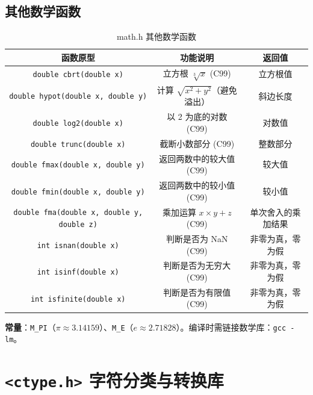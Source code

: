 \subsection{其他数学函数}

\begin{table}[H]
\centering
\small
\renewcommand{\arraystretch}{1.5}
\begin{tabulary}{\linewidth}{CCC}
\toprule
\textbf{函数原型} & \textbf{功能说明} & \textbf{返回值} \\ \midrule
\texttt{double cbrt(double x)} & 立方根 $\sqrt[3]{x}$ (C99) & 立方根值 \\ 
\texttt{double hypot(double x, double y)} & 计算 $\sqrt{x^2 + y^2}$（避免溢出） & 斜边长度 \\ 
\texttt{double log2(double x)} & 以 2 为底的对数 (C99) & 对数值 \\ 
\texttt{double trunc(double x)} & 截断小数部分 (C99) & 整数部分 \\ 
\texttt{double fmax(double x, double y)} & 返回两数中的较大值 (C99) & 较大值 \\ 
\texttt{double fmin(double x, double y)} & 返回两数中的较小值 (C99) & 较小值 \\ 
\texttt{double fma(double x, double y, double z)} & 乘加运算 $x \times y + z$ (C99) & 单次舍入的乘加结果 \\ 
\texttt{int isnan(double x)} & 判断是否为 NaN (C99) & 非零为真，零为假 \\ 
\texttt{int isinf(double x)} & 判断是否为无穷大 (C99) & 非零为真，零为假 \\ 
\texttt{int isfinite(double x)} & 判断是否为有限值 (C99) & 非零为真，零为假 \\ \bottomrule
\end{tabulary}
\caption{math.h 其他数学函数}
\label{tab:math_other}
\end{table}

\vspace{0.5em}
\noindent\textbf{常量}：\texttt{M\_PI}（$\pi \approx 3.14159$）、\texttt{M\_E}（$e \approx 2.71828$）。编译时需链接数学库：\texttt{gcc -lm}。

\section{\texorpdfstring{\texttt{<ctype.h>} 字符分类与转换库}{<ctype.h> 字符分类与转换库}}

